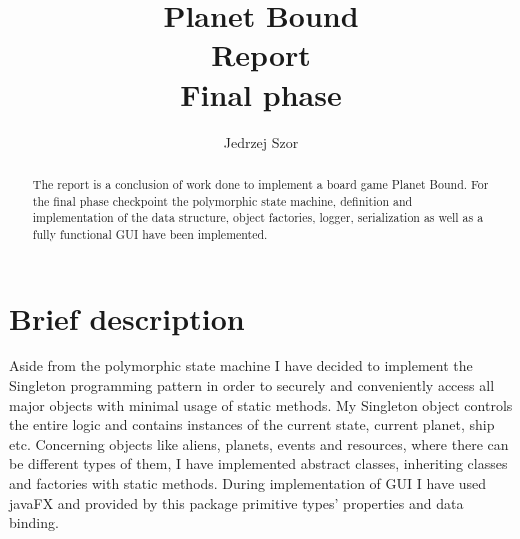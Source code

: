 \documentclass[a4paper,12pt]{article}
\begin{document}
	
\title{Planet Bound\\Report\\Final phase}
\author{Jedrzej Szor}

\maketitle

\begin{abstract}
The report is a conclusion of work done to implement a board game Planet Bound. For the final phase checkpoint the polymorphic state machine, definition and implementation of the data structure, object factories, logger, serialization as well as a fully functional GUI have been implemented.
\end{abstract}

\section{Brief description}
Aside from the polymorphic state machine I have decided to implement the Singleton programming pattern in order to securely and conveniently access all major objects with minimal usage of static methods. My Singleton object controls the entire logic and contains instances of the current state, current planet, ship etc. Concerning objects like aliens, planets, events and resources, where there can be different types of them, I have implemented abstract classes, inheriting classes and factories with static methods. During implementation of GUI I have used javaFX and provided by this package primitive types' properties and data binding.

\newpage
\end{document}
